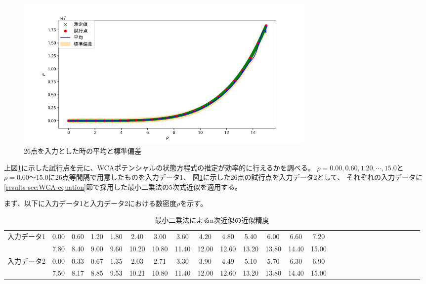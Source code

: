 \documentclass[titlepage]{jsreport}
\begin{document}
{{{\begin{figure}[htbp]
    \begin{center}
        \includegraphics[width=15cm]{fig/26plot-Gauss.png}
    \end{center}
    \caption{26点を入力とした時の平均と標準偏差}
    \label{fig:26plot}
\end{figure}

上図\ref{fig:26plot}に示した試行点を元に、WCAポテンシャルの状態方程式の推定が効率的に行えるかを調べる。
$\rho=0.00,0.60,1.20,\cdots,15.0$と$\rho=0.00〜15.0$に26点等間隔で用意したものを入力データ1、
図\ref{fig:26plot}に示した26点の試行点を入力データ2として、
それぞれの入力データに\ref{results-sec:WCA-equation}節で採用した最小二乗法の5次式近似を適用する。

まず、以下に入力データ1と入力データ2における数密度$\rho$を示す。

\begin{table}[htbp]
    \begin{center}
        \caption{最小二乗法によるn次近似の近似精度}
            \begin{tabular}{c||c c c c c c c c c c c c c c c c c c c c c c c c c c}
               
                    入力データ1& 0.00&0.60&1.20&1.80&2.40&3.00&3.60&4.20&4.80&5.40&6.00&6.60&7.20\\
                    &7.80&8.40&9.00&9.60&10.20&10.80&11.40&12.00&12.60&13.20&13.80&14.40&15.00\\ \hline
                    入力データ2& 0.00&0.33&0.67&1.35&2.03&2.71&3.30&3.90&4.49&5.10&5.70&6.30&6.90\\
                    &7.50&8.17&8.85&9.53&10.21&10.80&11.40&12.00&12.60&13.20&13.80&14.40&15.00
                    
            \end{tabular}
    \end{center}
    \label{table:compare-Gauss}
\end{table}

}}}
\end{document}

